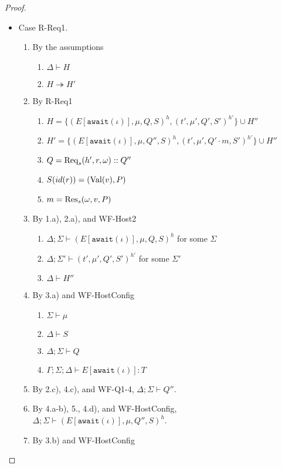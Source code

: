 \begin{proof}
\begin{itemize}
\item Case R-Req1.
\begin{enumerate}
\item By the assumptions
  \begin{enumerate}[label=(\alph*)]
  \item $\Delta \vdash H$
  \item $H \twoheadrightarrow H'$
  \end{enumerate}
\item By R-Req1
  \begin{enumerate}[label=(\alph*)]
  \item $H = \{ (E[\texttt{await}(\iota)], \mu, Q, S)^h, (t', \mu', Q', S')^{h'} \} \cup H''$
  \item $H' = \{ (E[\texttt{await}(\iota)], \mu, Q'', S)^h, (t', \mu', Q' \cdot m, S')^{h'} \} \cup H''$
  \item $Q        = {\textrm{Req}_s(h', r, \omega)} :: Q''$
  \item $S(id(r)) = (\textrm{Val}(v), P)$
  \item $m        = {\textrm{Res}_s(\omega, v, P)}$
  \end{enumerate}
\item By 1.a), 2.a), and WF-Host2
  \begin{enumerate}[label=(\alph*)]
  \item $\Delta ; \Sigma \vdash (E[\texttt{await}(\iota)], \mu, Q, S)^h$ for some $\Sigma$
  \item $\Delta ; \Sigma' \vdash (t', \mu', Q', S')^{h'}$ for some $\Sigma'$
  \item $\Delta \vdash H''$
  \end{enumerate}
\item By 3.a) and WF-HostConfig
  \begin{enumerate}[label=(\alph*)]
  \item $\Sigma \vdash \mu$
  \item $\Delta \vdash S$
  \item $\Delta ; \Sigma \vdash Q$
  \item $\Gamma ; \Sigma ; \Delta \vdash E[\texttt{await}(\iota)] : T$
  \end{enumerate}
\item By 2.c), 4.c), and WF-Q1-4, $\Delta ; \Sigma \vdash Q''$.
\item By 4.a-b), 5., 4.d), and WF-HostConfig, $\Delta ; \Sigma \vdash (E[\texttt{await}(\iota)], \mu, Q'', S)^h$.
\item By 3.b) and WF-HostConfig
  \begin{enumerate}[label=(\alph*)]

\end{enumerate}
\end{enumerate}
\end{itemize}
\end{proof}
